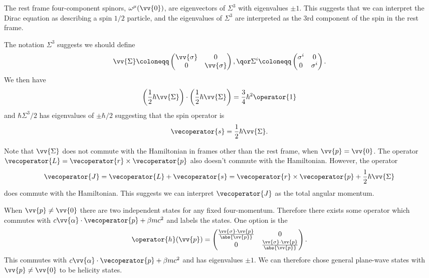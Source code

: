 The rest frame four-component spinors, \(\omega^\mu(\vv{0})\), are eigenvectors of \(\Sigma^3\) with eigenvalues \(\pm 1\).
This suggests that we can interpret the Dirac equation as describing a spin \(1/2\) particle, and the eigenvalues of \(\Sigma^3\) are interpreted as the 3rd component of the spin in the rest frame.

The notation \(\Sigma^3\) suggests we should define
\begin{equation}
    \vv{\Sigma} \coloneqq 
    \begin{pmatrix}
        \vv{\sigma} & 0\\
        0 & \vv{\sigma}
    \end{pmatrix}
    , \qor \Sigma^i \coloneqq
    \begin{pmatrix}
        \sigma^i & 0\\
        0 & \sigma^i
    \end{pmatrix}
    .
\end{equation}
We then have
\begin{equation}
    \left( \frac{1}{2}\hbar \vv{\Sigma} \right) \cdot \left( \frac{1}{2}\hbar \vv{\Sigma} \right) = \frac{3}{4}\hbar^2 \operator{1}
\end{equation}
and \(\hbar\Sigma^3/2\) has eigenvalues of \(\pm \hbar/2\) suggesting that the spin operator is
\begin{equation}
    \vecoperator{s} = \frac{1}{2}\hbar \vv{\Sigma}.
\end{equation}

Note that \(\vv{\Sigma}\) does not commute with the Hamiltonian in frames other than the rest frame, when \(\vv{p} = \vv{0}\).
The operator \(\vecoperator{L} = \vecoperator{r} \times \vecoperator{p}\) also doesn't commute with the Hamiltonian.
However, the operator
\begin{equation}
    \vecoperator{J} = \vecoperator{L} + \vecoperator{s} = \vecoperator{r} \times \vecoperator{p} + \frac{1}{2}\hbar\vv{\Sigma}
\end{equation}
does commute with the Hamiltonian.
This suggests we can interpret \(\vecoperator{J}\) as the total angular momentum.

When \(\vv{p} \ne \vv{0}\) there are two independent states for any fixed four-momentum.
Therefore there exists some operator which commutes with \(c\vv{\alpha} \cdot \vecoperator{p} + \beta mc^2\) and labels the states.
One option is the 
\begin{equation}
    \operator{h}(\vv{p}) = 
    \begin{pmatrix}
        \frac{\vv{\sigma} \cdot \vv{p}}{\abs{\vv{p}}} & 0\\
        0 & \frac{\vv{\sigma}\cdot\vv{p}}{\abs{\vv{p}}}
    \end{pmatrix}
    .
\end{equation}
This commutes with \(c\vv{\alpha} \cdot\vecoperator{p} + \beta mc^2\) and has eigenvalues \(\pm 1\).
We can therefore chose general plane-wave states with \(\vv{p} \ne \vv{0}\) to be helicity states.
